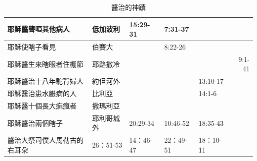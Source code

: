 \begin{table}[htbp]
\begin{tabular}{|p{15.145em}|p{5.785em}|l|l|p{6.5em}|r|}
    \midrule
    耶穌醫聾啞其他病人 & 低加波利  & \multicolumn{1}{p{6.215em}|}{15:29-31} & \multicolumn{1}{p{5.215em}|}{7:31-37} & \multicolumn{1}{r|}{} &  \\
    \midrule
    耶穌使瞎子看見 & 伯賽大   &       & \multicolumn{1}{p{5.215em}|}{8:22-26} & \multicolumn{1}{r|}{} &  \\
    \midrule
    耶穌醫生來瞎眼者住棚節 & 耶路撒冷  &       &       & \multicolumn{1}{r|}{} & \multicolumn{1}{p{5em}|}{9:1-41} \\
    \midrule
    耶穌醫治十八年駝背婦人 & 約但河外  &       &       & 13:10-17 &  \\
    \midrule
    耶穌醫治患水臌病的人 & 比利亞   &       &       & 14:1-6 &  \\
    \midrule
    耶穌醫十個長大痲瘋者 & 撒瑪利亞  &       &       & \multicolumn{1}{r|}{} &  \\
    \midrule
    耶穌醫治兩個瞎子 & 耶利哥城外 & \multicolumn{1}{p{6.215em}|}{20:29-34} & \multicolumn{1}{p{5.215em}|}{10:46-52} & 18:35-43 &  \\
    \midrule
    醫治大祭司僕人馬勒古的右耳朵 & 26：51-53 & 14：46-47 & 22：49-51 & 18：10-11 &  \\    \bottomrule
    \end{tabular}%
     \caption{醫治的神蹟}
  \label{tab:addlabel}%
\end{table}%



